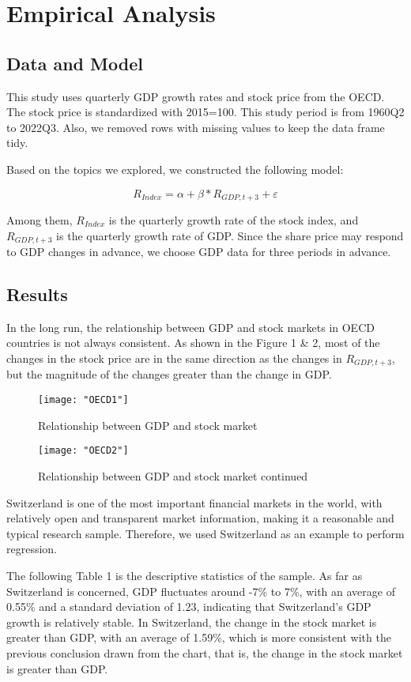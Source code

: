 \documentclass[../main.tex]{subfiles}
\begin{document}
\section{Empirical Analysis}

\subsection{Data and Model}
This study uses quarterly GDP growth rates and stock price from the OECD. The stock price is standardized with 2015=100. This study period is from  1960Q2 to 2022Q3. Also, we removed rows with missing values to keep the data frame tidy.

Based on the topics we explored, we constructed the following model:

$$R_{Index} = \alpha + \beta * R_{GDP,t+3} + \varepsilon $$

Among them, $R_{Index}$ is the quarterly growth rate of the stock index, and $R_{GDP,t+3}$ is the quarterly growth rate of GDP. Since the share price may respond to GDP changes in advance, we choose GDP data for three periods in advance.

\subsection{Results}
In the long run, the relationship between GDP and stock markets in OECD countries is not always consistent. As shown in the Figure 1 & 2, most of the changes in the stock price are in the same direction as the changes in $R_{GDP,t+3}$, but the magnitude of the changes greater than the change in GDP.

\begin{figure}[htp]
\centering
\texttt{[image: "OECD1"]}
\caption{Relationship between GDP and stock market}
\label{OECD Lines 1}
\end{figure}

\begin{figure}[htp]
\centering
\texttt{[image: "OECD2"]}
\caption{Relationship between GDP and stock market continued}
\label{OECD Lines 2}
\end{figure}

Switzerland is one of the most important financial markets in the world, with relatively open and transparent market information, making it a reasonable and typical research sample. Therefore, we used Switzerland as an example to perform regression.

The following Table 1 is the descriptive statistics of the sample. As far as Switzerland is concerned, GDP fluctuates around -7\% to 7\%, with an average of 0.55\% and a standard deviation of 1.23, indicating that Switzerland's GDP growth is relatively stable. In Switzerland, the change in the stock market is greater than GDP, with an average of 1.59\%, which is more consistent with the previous conclusion drawn from the chart, that is, the change in the stock market is greater than GDP.
\end{document}
